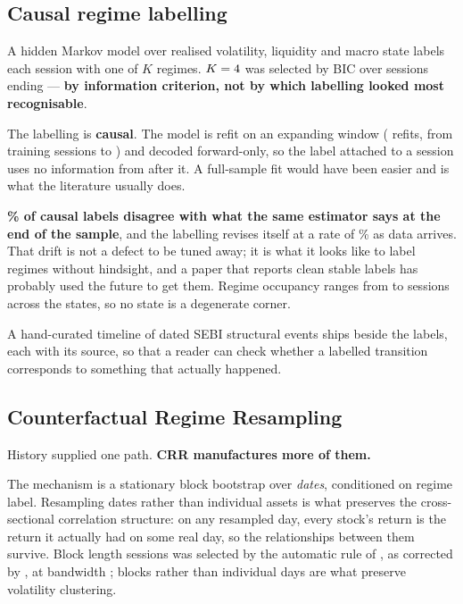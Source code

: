 \documentclass[11pt,a4paper]{article}
\begin{document}
\subsection{Causal regime labelling}
\label{sec:regimes}

A hidden Markov model \citep{rabiner1989} over realised volatility, liquidity and macro state
labels each session with one of $K$ regimes. $K = 4{}$ was selected by BIC
\citep{schwarz1978} over \rsRegimeSelectionSessions{} sessions ending \rsRegimeSelectionEnd{} ---
\textbf{by information criterion, not by which labelling looked most recognisable}.

The labelling is \textbf{causal}. The model is refit on an expanding window
(\rsNRegimeRefits{} refits, from \rsRegimeTrainingSessionsFirst{} training sessions to
\rsRegimeTrainingSessionsLast{}) and decoded forward-only, so the label attached to a session uses
no information from after it. A full-sample fit would have been easier and is what the literature
usually does.

\begin{selfreport}[title={What causality costs, reported rather than smoothed}]
\textbf{\rsRegimeTerminalDisagreement\% of causal labels disagree with what the same estimator says
at the end of the sample}, and the labelling revises itself at a rate of
\rsRegimeRevisionRate\% as data arrives. That drift is not a defect to be tuned away; it is what
it looks like to label regimes without hindsight, and a paper that reports clean stable labels has
probably used the future to get them. Regime occupancy ranges from \rsRegimeOccupancyMin{} to
\rsRegimeOccupancyMax{} sessions across the \rsRegimeK{} states, so no state is a degenerate corner.
\end{selfreport}

A hand-curated timeline of \rsNSebiEvents{} dated SEBI structural events ships beside the labels,
each with its source, so that a reader can check whether a labelled transition corresponds to
something that actually happened.

\subsection{Counterfactual Regime Resampling}
\label{sec:crr}

History supplied one path. \textbf{CRR manufactures more of them.}

The mechanism is a stationary block bootstrap \citep{politis1994} over \emph{dates}, conditioned on
regime label. Resampling dates rather than individual assets is what preserves the cross-sectional
correlation structure: on any resampled day, every stock's return is the return it actually had
on some real day, so the relationships between them survive. Block length
\rsBlockLength{} sessions was selected by the automatic rule of \citet{politis2004}, as corrected
by \citet{patton2009}, at bandwidth \rsBlockBandwidth{}; blocks rather than individual days are
what preserve volatility clustering.
\end{document}
